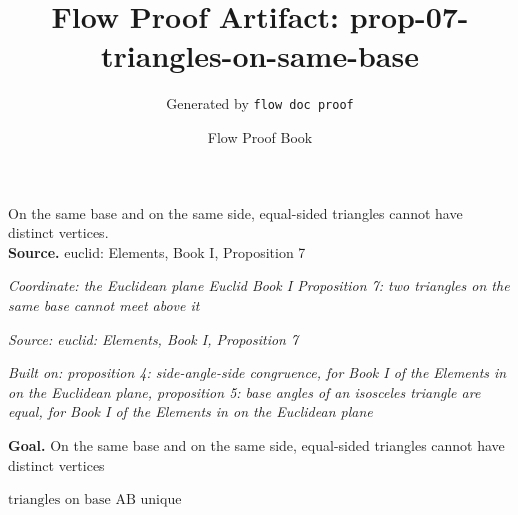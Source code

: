 \documentclass[11pt]{article}
\title{Flow Proof Artifact: prop-07-triangles-on-same-base}
\author{Generated by \texttt{flow doc proof}}
\date{Flow Proof Book}
\theoremstyle{definition}
\begin{document}
\maketitle
On the same base and on the same side, equal-sided triangles cannot have distinct vertices.\\[0.5em]
\textbf{Source.} euclid: Elements, Book I, Proposition 7\\[0.5em]
\bigskip
{}\par
\smallskip\noindent\textit{Coordinate: the Euclidean plane \cdot Euclid Book I \cdot Proposition 7: two triangles on the same base cannot meet above it}\par
\smallskip\noindent\textit{Source: euclid: Elements, Book I, Proposition 7}\par
\smallskip\noindent\textit{Built on: proposition 4: side-angle-side congruence, for Book I of the Elements in on the Euclidean plane, proposition 5: base angles of an isosceles triangle are equal, for Book I of the Elements in on the Euclidean plane}\par
\medskip
\noindent\textbf{Goal.} On the same base and on the same side, equal-sided triangles cannot have distinct vertices\par
\noindent$\displaystyle \text{triangles on base AB unique}$\par
\medskip
\noindent
\end{document}
